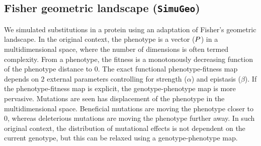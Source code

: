 \begin{table}[H]
    \centering
    \noindent{}
    \caption[Inferred amino-acid entropy for \texttt{SimuPoly}]{
    Estimated amino-acid entropy under simulation accounting for finite population effects, site linkage and short term fluctuation of $\Ne$.
    Estimation is obtained with the mechanistic inference model developed in this paper of site-specific amino-acid fitness profiles and log-Brownian process for $\Ne$, $\mu$ and life-history traits (in the left column), or under the assumption of constant $\Ne$ (in the right column).}
\end{table}

\subsection{Fisher geometric landscape (\texttt{SimuGeo})}
\label{subsec:fisher-geometric-landscape}

We simulated substitutions in a protein using an adaptation of Fisher's geometric landscape.
In the original context, the phenotype is a vector ($P$) in a multidimensional space, where the number of dimensions is often termed complexity.
From a phenotype, the fitness is a monotonously decreasing function of the phenotype distance to $0$.
The exact functional phenotype-fitness map depends on $2$ external parameters controlling for strength ($\alpha$) and epistasis ($\beta$).
If the phenotype-fitness map is explicit, the genotype-phenotype map is more pervasive.
Mutations are seen has displacement of the phenotype in the multidimensional space.
Beneficial mutations are moving the phenotype closer to $0$, whereas deleterious mutations are moving the phenotype further away.
In such original context, the distribution of mutational effects is not dependent on the current genotype, but this can be relaxed using a genotype-phenotype map.\\


